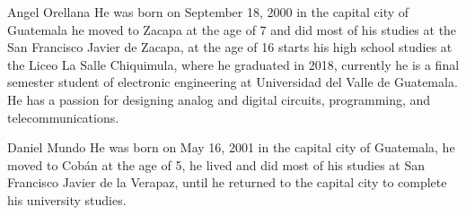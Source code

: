 \begin{IEEEbiography}{Angel Orellana}
He was born on September 18, 2000 in the capital city of Guatemala
he moved to Zacapa at the age of 7 and did most of his studies at the
San Francisco Javier de Zacapa, at the age of 16 starts his high school studies at the
Liceo La Salle Chiquimula, where he graduated in 2018, currently
he is a final semester student of 
electronic engineering at Universidad del Valle 
de Guatemala. He has a passion for designing analog and digital circuits, 
programming, and telecommunications.
\end{IEEEbiography}

\begin{IEEEbiography}{Daniel Mundo}
    He was born on May 16, 2001 in the capital city of Guatemala, he moved to Cobán at the age of 5, he lived and did most of his studies at San Francisco Javier de la Verapaz, until he returned to the capital city to complete his university studies.
    \end{IEEEbiography}
        
